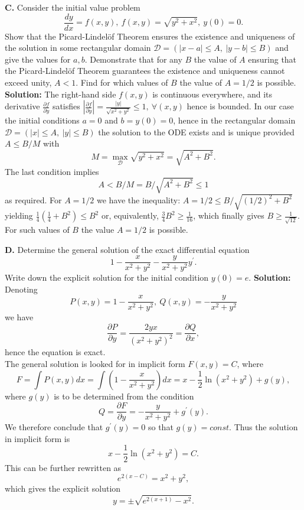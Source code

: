 \documentclass[11pt,a4paper]{article}
\begin{document}
	\textbf{C.} Consider the initial value problem
	$$
	\frac{dy}{dx} = f(x,y),\ f(x,y) = \sqrt{y^2+x^2},\ y(0) = 0.
	$$
	Show that the Picard-Lindel\"{o}f Theorem ensures the existence and uniqueness of the solution in some rectangular domain $\mathcal{D}=(|x-a|\leq A,\ |y-b|\leq B)$ and give the values for $a, b$. Demonstrate that for any $B$ the value of $A$ ensuring that the Picard-Lindel\"{o}f Theorem guarantees the existence and uniqueness cannot exceed unity, $A < 1$. Find for which values of $B$ the value of $A = 1/2$ is possible.\\
	\textbf{Solution:} The right-hand side $f(x, y)$ is continuous everywhere, and its derivative $\frac{\partial f}{\partial y}$ satisfies $\left\lvert \frac{\partial f}{\partial y}\right\rvert = \frac{|y|}{\sqrt{x^2+y^2}}\leq 1,\ \forall (x,y)$ hence is bounded. In our case the initial conditions $a = 0$ and $b = y(0) = 0$, hence in the rectangular domain $\mathcal{D} = (|x|\leq A,\ |y|\leq B)$ the solution to the ODE exists and is unique provided $A \leq B/M$ with
	$$
	M = \max_\mathcal{D}\sqrt{y^2+x^2} = \sqrt{A^2+B^2}.
	$$
	The last condition implies
	$$
	A < B/M = B/\sqrt{A^2+B^2}\leq 1
	$$
	as required. For $A = 1/2$ we have the inequality: $A=1/2 \leq B/\sqrt{(1/2)^2+B^2}$ yielding $\frac{1}{4}\left(\frac{1}{4}+B^2\right)\leq B^2$ or, equivalently, $\frac{3}{4}B^2\geq \frac{1}{16}$, which finally gives $B \geq \frac{1}{\sqrt{12}}$. For such values
	of $B$ the value $A = 1/2$ is possible.\par
	\textbf{D.} Determine the general solution of the exact differential equation
	$$
	1-\frac{x}{x^2+y^2}-\frac{y}{x^2+y^2}y^\prime .
	$$
	Write down the explicit solution for the initial condition $y(0) = e$.
	\textbf{Solution:} Denoting
	$$
	P(x,y) = 1-\frac{x}{x^2+y^2},\ Q(x,y) = -\frac{y}{x^2+y^2}
	$$
	we have
	$$
	\frac{\partial P}{\partial y}=\frac{2yx}{(x^2+y^2)^2}=\frac{\partial Q}{\partial x},
	$$
	hence the equation is exact.\\
	The general solution is looked for in implicit form $F(x, y) = C$, where
	$$
	F
	= \int P(x,y)dx
	= \int \left(1-\frac{x}{x^2+y^2}\right)dx
	= x-\frac{1}{2}\ln (x^2+y^2)+g(y),
	$$
	where $g(y)$ is to be determined from the condition
	$$
	Q = \frac{\partial F}{\partial y} = -\frac{y}{x^2+y^2}+g^\prime(y).
	$$
	We therefore conclude that $g^\prime (y) = 0$ so that $g(y) = const$. Thus the solution in implicit form is
	$$
	x-\frac{1}{2}\ln (x^2+y^2) = C.
	$$
	This can be further rewritten as
	$$
	e^{2(x-C)} = x^2+y^2,
	$$
	which gives the explicit solution
	$$
	y = \pm \sqrt{e^{2(x+1)}-x^2}.
	$$
\end{document}
